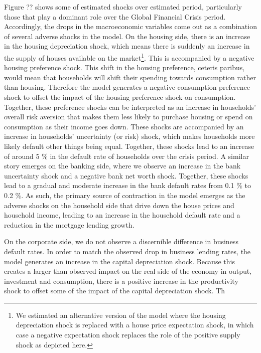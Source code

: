 \documentclass[12pt]{article}
\numberwithin{equation}{section}
\begin{document}
Figure ?? shows some of estimated shocks over estimated period, particularly those that play a dominant role over the Global Financial Crisis period. Accordingly, the drops in the macroeconomic variables come out as a combination of several adverse shocks in the model. On the housing side, there is an increase in the housing depreciation shock, which means there is suddenly an increase in the supply of houses available on the market\footnote{We estimated an alternative version of the model where the housing depreciation shock is replaced with a house price expectation shock, in which case a negative expectation shock replaces the role of the positive supply shock as depicted here.}. This is accompanied by a negative housing preference shock. This shift in the housing preference, ceteris paribus, would mean that households will shift their spending towards consumption rather than housing. Therefore the model generates a negative consumption preference shock to offset the impact of the housing preference shock on consumption. Together, these preference shocks can be interpreted as an increase in households' overall risk aversion that makes them less likely to purchase housing or spend on consumption as their income goes down. These shocks are accompanied by an increase in households' uncertainty (or risk) shock, which makes households more likely default other things being equal. Together, these shocks lead to an increase of around 5 \% in the default rate of households over the crisis period. A similar story emerges on the banking side, where we observe an increase in the bank uncertainty shock and a negative bank net worth shock. Together, these shocks lead to a gradual and moderate increase in the bank default rates from  0.1 \% to 0.2 \%. As such, the primary source of contraction in the model emerges as the adverse shocks on the household side that drive down the house prices and household income, leading to an increase in the household default rate and a reduction in the mortgage lending growth.

On the corporate side, we do not observe a discernible difference in business default rates. In order to match the observed drop in business lending rates, the model generates an increase in the capital depreciation shock. Because this creates a larger than observed impact on the real side of the economy in output, investment and consumption, there is a positive increase in the productivity shock to offset some of the impact of the capital depreciation shock. Th
\end{document}

